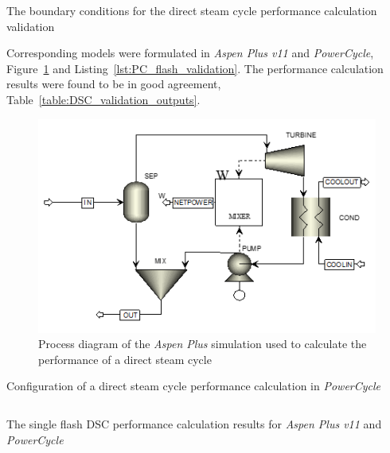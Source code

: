         \begin{table}[H]
            \caption{The boundary conditions for the direct steam cycle performance calculation validation}
            \centering 
            \label{table:DSC_validation_inputs}
            
        \end{table}

        Corresponding models were formulated in \emph{Aspen Plus v11} and \emph{PowerCycle}, Figure~\ref{fig:Aspen_flash_validation} and Listing~\ref{lst:PC_flash_validation}. The performance calculation results were found to be in good agreement, Table~\ref{table:DSC_validation_outputs}.

        \begin{figure}[H]
            \centering
            \includegraphics{Content/PowerCycle/Figures/AspenPLus_FlashValidation.png}
            \caption{Process diagram of the \emph{Aspen Plus} simulation used to calculate the performance of a direct steam cycle}
            \label{fig:Aspen_flash_validation}
        \end{figure}

        \begin{listing}[H]
            \caption{Configuration of a direct steam cycle performance calculation in \emph{PowerCycle}}
            \inputminted[bgcolor=bg,linenos, fontsize=\footnotesize]{python}{Content/PowerCycle/Code/FlashPerf_snippet.py}
            \label{lst:PC_flash_validation}
            \vspace{-20pt}
        \end{listing}

        \begin{table}[H]
            \caption{The single flash \ac{DSC} performance calculation results for \emph{Aspen Plus v11} and \emph{PowerCycle}}
            \centering 
            \label{table:DSC_validation_outputs}
            
        \end{table}

